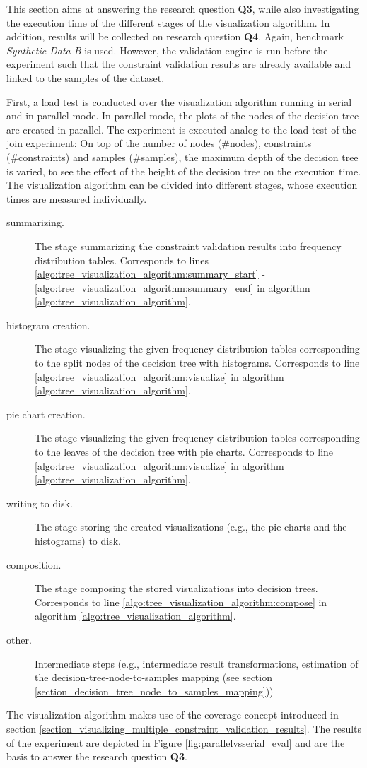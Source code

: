 This section aims at answering the research question \textbf{Q3}, while also investigating the execution time of the different stages of the visualization algorithm. In addition, results will be collected on research question \textbf{Q4}. Again, benchmark \textit{Synthetic Data B} is used. However, the validation engine is run before the experiment such that the constraint validation results are already available and linked to the samples of the dataset. 

First, a load test is conducted over the visualization algorithm running in serial and in parallel mode. In parallel mode, the plots of the nodes of the decision tree are created in parallel. The experiment is executed analog to the load test of the join experiment: On top of the number of nodes (\#nodes), constraints (\#constraints) and samples (\#samples), the maximum depth of the decision tree is varied, to see the effect of the height of the decision tree on the execution time. The visualization algorithm can be divided into different stages, whose execution times are measured individually. 

\begin{description}
\item[summarizing.] The stage summarizing the constraint validation results into frequency distribution tables. Corresponds to lines \ref{algo:tree_visualization_algorithm:summary_start} - \ref{algo:tree_visualization_algorithm:summary_end} in algorithm \ref{algo:tree_visualization_algorithm}.
\item[histogram creation.] The stage visualizing the given frequency distribution tables corresponding to the split nodes of the decision tree with histograms. Corresponds to line \ref{algo:tree_visualization_algorithm:visualize} in algorithm \ref{algo:tree_visualization_algorithm}.
\item[pie chart creation.] The stage visualizing the given frequency distribution tables corresponding to the leaves of the decision tree with pie charts. Corresponds to line \ref{algo:tree_visualization_algorithm:visualize} in algorithm \ref{algo:tree_visualization_algorithm}.
\item[writing to disk.] The stage storing the created visualizations (e.g., the pie charts and the histograms) to disk.
\item[composition.] The stage composing the stored visualizations into decision trees. Corresponds to line \ref{algo:tree_visualization_algorithm:compose} in algorithm \ref{algo:tree_visualization_algorithm}.
\item[other.] Intermediate steps (e.g., intermediate result transformations, estimation of the decision-tree-node-to-samples mapping (see section \ref{section_decision_tree_node_to_samples_mapping}))
\end{description}
The visualization algorithm makes use of the coverage concept introduced in section \ref{section_visualizing_multiple_constraint_validation_results}. The results of the experiment are depicted in Figure \ref{fig:parallelvsserial_eval} and are the basis to answer the research question \textbf{Q3}.

